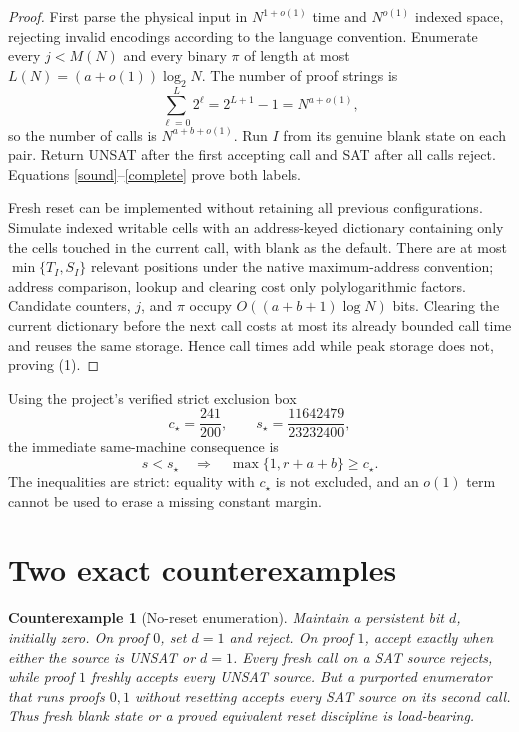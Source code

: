 \documentclass[11pt]{article}
\newtheorem{counterexample}[theorem]{Counterexample}
\begin{document}
\begin{proof}
First parse the physical input in $N^{1+o(1)}$ time and $N^{o(1)}$ indexed space, rejecting invalid encodings according to the language convention.  Enumerate every $j<M(N)$ and every binary $\pi$ of length at most $L(N)=(a+o(1))\log_2N$.  The number of proof strings is
\[
             \sum_{\ell=0}^{L}2^\ell=2^{L+1}-1=N^{a+o(1)},
\]
so the number of calls is $N^{a+b+o(1)}$.  Run $I$ from its genuine blank state on each pair.  Return UNSAT after the first accepting call and SAT after all calls reject.  Equations \eqref{sound}--\eqref{complete} prove both labels.

Fresh reset can be implemented without retaining all previous configurations.  Simulate indexed writable cells with an address-keyed dictionary containing only the cells touched in the current call, with blank as the default.  There are at most $\min\{T_I,S_I\}$ relevant positions under the native maximum-address convention; address comparison, lookup and clearing cost only polylogarithmic factors.  Candidate counters, $j$, and $\pi$ occupy $O((a+b+1)\log N)$ bits.  Clearing the current dictionary before the next call costs at most its already bounded call time and reuses the same storage.  Hence call times add while peak storage does not, proving (1).
\end{proof}

Using the project's verified strict exclusion box
\[
 c_\star=\frac{241}{200},\qquad
 s_\star=\frac{11642479}{23232400},
\]
the immediate same-machine consequence is
\[
 s<s_\star\quad\Longrightarrow\quad
 \max\{1,r+a+b\}\ge c_\star.                    \tag{2}
\]
The inequalities are strict: equality with $c_\star$ is not excluded, and an $o(1)$ term cannot be used to erase a missing constant margin.

\section{Two exact counterexamples}

\begin{counterexample}[No-reset enumeration]
Maintain a persistent bit $d$, initially zero.  On proof $0$, set $d=1$ and reject.  On proof $1$, accept exactly when either the source is UNSAT or $d=1$.  Every \emph{fresh} call on a SAT source rejects, while proof $1$ freshly accepts every UNSAT source.  But a purported enumerator that runs proofs $0,1$ without resetting accepts every SAT source on its second call.  Thus fresh blank state or a proved equivalent reset discipline is load-bearing.
\end{counterexample}
\end{document}
